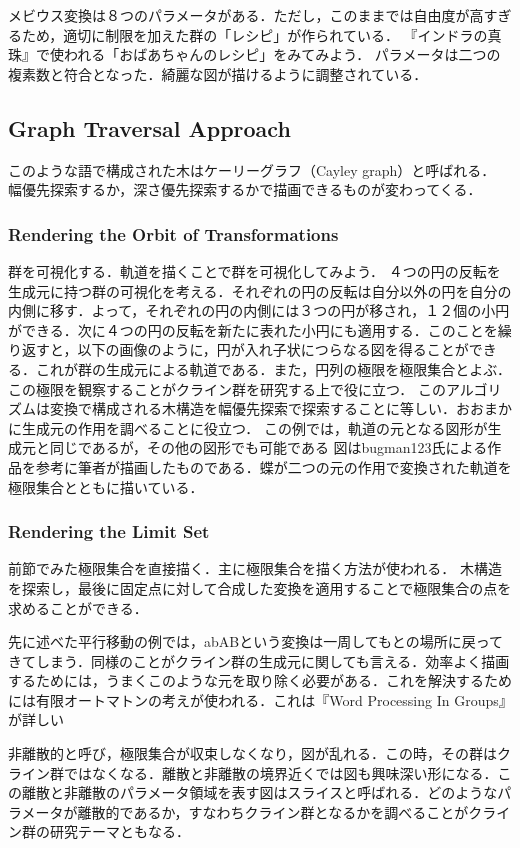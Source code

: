 メビウス変換は８つのパラメータがある．ただし，このままでは自由度が高すぎるため，適切に制限を加えた群の「レシピ」が作られている．
『インドラの真珠』で使われる「おばあちゃんのレシピ」をみてみよう．
パラメータは二つの複素数と符合となった．綺麗な図が描けるように調整されている．

\subsection{Graph Traversal Approach}

このような語で構成された木はケーリーグラフ（Cayley graph）と呼ばれる．
幅優先探索するか，深さ優先探索するかで描画できるものが変わってくる．

\subsubsection{Rendering the Orbit of Transformations}
群を可視化する．軌道を描くことで群を可視化してみよう．
４つの円の反転を生成元に持つ群の可視化を考える．それぞれの円の反転は自分以外の円を自分の内側に移す．よって，それぞれの円の内側には３つの円が移され，１２個の小円ができる．次に４つの円の反転を新たに表れた小円にも適用する．このことを繰り返すと，以下の画像のように，円が入れ子状につらなる図を得ることができる．これが群の生成元による軌道である．また，円列の極限を極限集合とよぶ．この極限を観察することがクライン群を研究する上で役に立つ．
このアルゴリズムは変換で構成される木構造を幅優先探索で探索することに等しい．おおまかに生成元の作用を調べることに役立つ．
この例では，軌道の元となる図形が生成元と同じであるが，その他の図形でも可能である
図はbugman123氏による作品を参考に筆者が描画したものである．蝶が二つの元の作用で変換された軌道を極限集合とともに描いている．

\subsubsection{Rendering the Limit Set}
前節でみた極限集合を直接描く．主に極限集合を描く方法が使われる．
木構造を探索し，最後に固定点に対して合成した変換を適用することで極限集合の点を求めることができる．

先に述べた平行移動の例では，abABという変換は一周してもとの場所に戻ってきてしまう．同様のことがクライン群の生成元に関しても言える．効率よく描画するためには，うまくこのような元を取り除く必要がある．これを解決するためには有限オートマトンの考えが使われる．これは『Word Processing In Groups』が詳しい

非離散的と呼び，極限集合が収束しなくなり，図が乱れる．この時，その群はクライン群ではなくなる．離散と非離散の境界近くでは図も興味深い形になる．この離散と非離散のパラメータ領域を表す図はスライスと呼ばれる．どのようなパラメータが離散的であるか，すなわちクライン群となるかを調べることがクライン群の研究テーマともなる．

